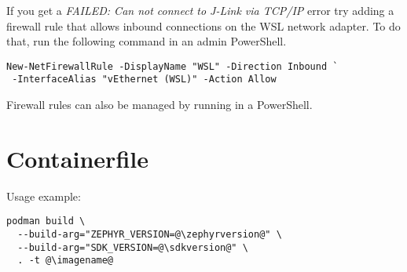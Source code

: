 \begin{infobox}
  If you get a \emph{FAILED: Can not connect to J-Link via TCP/IP} error try
  adding a firewall rule that allows inbound connections on the WSL network
  adapter. To do that, run the following command in an admin PowerShell.

  \begin{lstlisting}
New-NetFirewallRule -DisplayName "WSL" -Direction Inbound `
 -InterfaceAlias "vEthernet (WSL)" -Action Allow
\end{lstlisting}

  Firewall rules can also be managed by running  in a PowerShell.
\end{infobox}

\newpage

\fancyfoot{}

\section{Containerfile}\label{containerfile}



Usage example:

\begin{lstlisting}
podman build \
  --build-arg="ZEPHYR_VERSION=@\zephyrversion@" \
  --build-arg="SDK_VERSION=@\sdkversion@" \
  . -t @\imagename@
\end{lstlisting}



